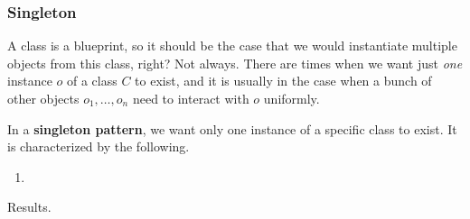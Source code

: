   \subsubsection{Singleton} 

    A class is a blueprint, so it should be the case that we would instantiate multiple objects from this class, right? Not always. There are times when we want just \textit{one} instance $o$ of a class $C$ to exist, and it is usually in the case when a bunch of other objects $o_1, \ldots, o_n$ need to interact with $o$ uniformly. 

    \begin{definition}[Singleton]
      In a \textbf{singleton pattern}, we want only one instance of a specific class to exist. It is characterized by the following. 
      \begin{enumerate}
        \item 
      \end{enumerate}
    \end{definition}

    Results. 

